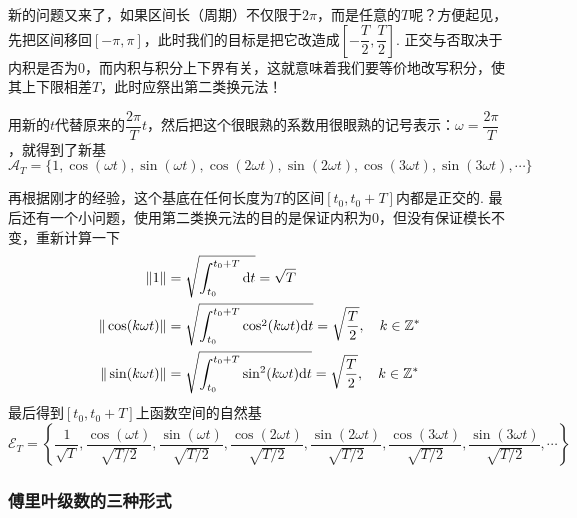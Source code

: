 \documentclass[UTF8]{ctexart}
\newcommand{\trm}[1]{{\rm #1}}
\begin{document}
新的问题又来了，如果区间长（周期）不仅限于\(2\pi\)，而是任意的\(T\)呢？方便起见，先把区间移回\([-\pi,\pi]\)，此时我们的目标是把它改造成\([-\dfrac{T}{2},\dfrac{T}{2}]\). 正交与否取决于内积是否为\(0\)，而内积与积分上下界有关，这就意味着我们要等价地改写积分，使其上下限相差\(T\)，此时应祭出第二类换元法！

用新的\(t\)代替原来的\(\dfrac{2\pi}{T}t\)，然后把这个很眼熟的系数用很眼熟的记号表示：\(\omega=\dfrac{2\pi}{T}\)，就得到了新基
\[ \mathcal{A}_{T} = \{ 1, \cos(\omega t), \sin(\omega t), \cos(2\omega t), \sin(2\omega t), \cos(3\omega t), \sin(3\omega t), \cdots \} \]

再根据刚才的经验，这个基底在任何长度为\(T\)的区间\([t_0,t_0+T]\)内都是正交的. 最后还有一个小问题，使用第二类换元法的目的是保证内积为\(0\)，但没有保证模长不变，重新计算一下
\begin{align*}
    \|1\| &= \sqrt{\int_{t_0}^{t_0+T}\trm{d}t} = \sqrt{T} \\
    \|\cos(k\omega t)\| &= \sqrt{\int_{t_0}^{t_0+T} \cos^2(k\omega t) \trm{d}t} = \sqrt{\frac{T}{2}},\quad k \in \mathbb{Z}^* \\
    \|\sin(k\omega t)\| &= \sqrt{\int_{t_0}^{t_0+T} \sin^2(k\omega t) \trm{d}t} = \sqrt{\frac{T}{2}},\quad k \in \mathbb{Z}^*
\end{align*}
最后得到\([t_0,t_0+T]\)上函数空间的自然基
\[ \mathcal{E}_{T} = \left\{ \frac{1}{\sqrt{T}}, \frac{\cos(\omega t)}{\sqrt{T/2}}, \frac{\sin(\omega t)}{\sqrt{T/2}}, \frac{\cos(2\omega t)}{\sqrt{T/2}}, \frac{\sin(2\omega t)}{\sqrt{T/2}}, \frac{\cos(3\omega t)}{\sqrt{T/2}}, \frac{\sin(3\omega t)}{\sqrt{T/2}}, \cdots \right\} \]


\subsubsection{傅里叶级数的三种形式}
\end{document}
